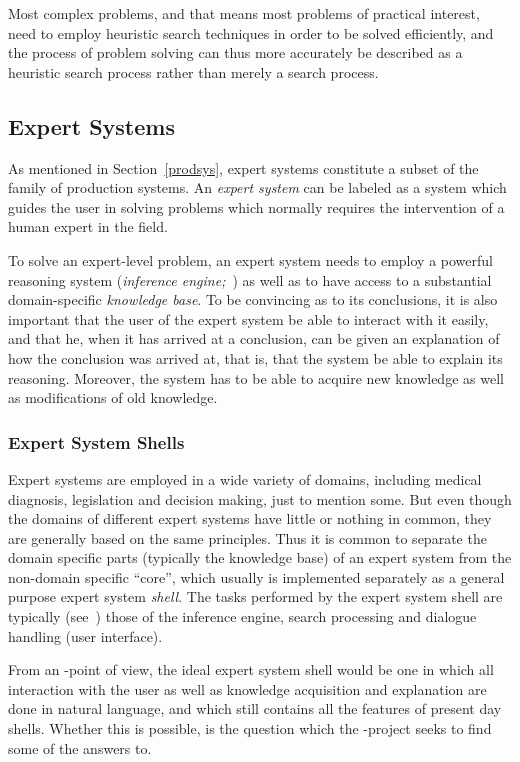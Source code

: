 Most complex problems, and that means most problems of practical
interest, need to employ heuristic search techniques in order to be
solved efficiently, and the process of problem solving can thus more
accurately be described as a heuristic search process rather than
merely a search process.

\subsection{Expert Systems}
\label{expert}

As mentioned in Section~\ref{prodsys}, expert systems constitute a
subset of the family of production systems.  An {\em expert system\/}
can be labeled as a system which guides the user in solving problems
which normally requires the intervention of a human expert in the
field.

To solve an expert-level problem, an expert system needs to employ a
powerful reasoning system ({\em inference engine;\/}~\cite{amble}) as
well as to have access to a substantial domain-specific {\em knowledge
base\/}. To be convincing as to its conclusions, it is also important
that the user of the expert system be able to interact with it easily,
and that he, when it has arrived at a conclusion, can be given an
explanation of how the conclusion was arrived at, that is, that the
system be able to explain its reasoning.  Moreover, the system has to
be able to acquire new knowledge as well as modifications of old
knowledge.

\subsubsection{Expert System Shells}

Expert systems are employed in a wide variety of domains, including
medical diagnosis, legislation and decision making, just to mention
some. But even though the domains of different expert systems have
little or nothing in common, they are generally based on the same
principles. Thus it is common to separate the domain specific parts
(typically the knowledge base) of an expert system from the non-domain
specific ``core'', which usually is implemented separately as a
general purpose expert system {\em shell\/}. The tasks performed by
the expert system shell are typically (see~\cite{amble}) those of the
inference engine, search processing and dialogue handling (user
interface).

From an {\nlp}-point of view, the ideal expert system shell would be
one in which all interaction with the user as well as knowledge
acquisition and explanation are done in natural language, and which
still contains all the features of present day shells. Whether this is
possible, is the question which the {\tuc}-project seeks to find some
of the answers to.
